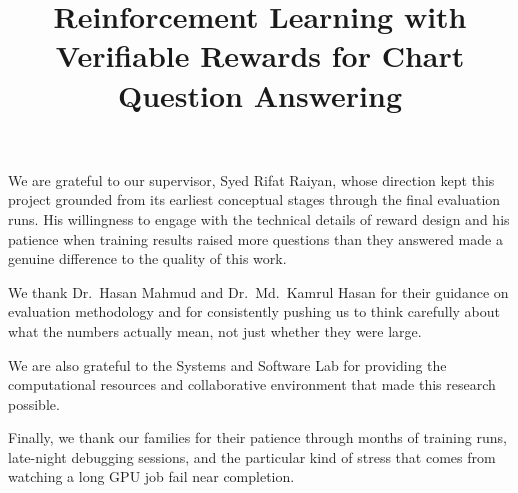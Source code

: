 \documentclass{iutbscthesis}
\title{Reinforcement Learning with Verifiable Rewards for Chart Question Answering}
\begin{document}

\coverpage
{}
\declarationofcandidate


\tableofcontents
\listoffigures
\listoftables

\clearpage

\begin{abbreviations}
\end{abbreviations}

\begin{acknowledgement}
We are grateful to our supervisor, Syed Rifat Raiyan, whose direction kept this project grounded from its earliest conceptual stages through the final evaluation runs. His willingness to engage with the technical details of reward design and his patience when training results raised more questions than they answered made a genuine difference to the quality of this work.

We thank Dr.\ Hasan Mahmud and Dr.\ Md.\ Kamrul Hasan for their guidance on evaluation methodology and for consistently pushing us to think carefully about what the numbers actually mean, not just whether they were large.

We are also grateful to the Systems and Software Lab for providing the computational resources and collaborative environment that made this research possible.

Finally, we thank our families for their patience through months of training runs, late-night debugging sessions, and the particular kind of stress that comes from watching a long GPU job fail near completion.
\end{acknowledgement}
\end{document}
